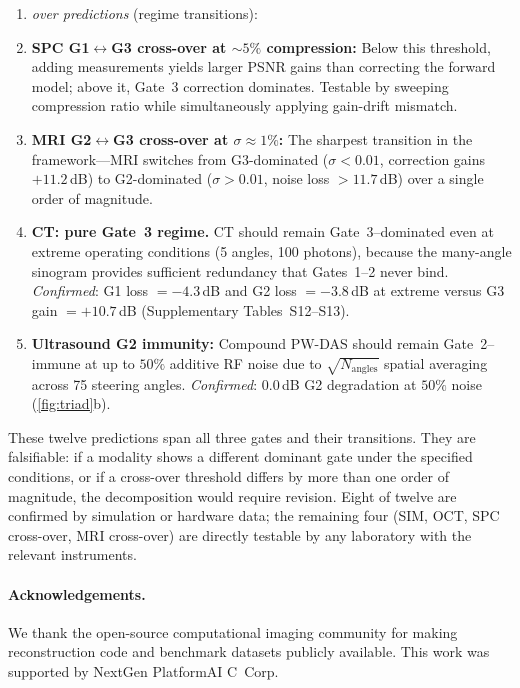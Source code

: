 \begin{enumerate}
\item[\textit{Cross-}] \textit{over predictions} (regime transitions):
\item \textbf{SPC G1$\leftrightarrow$G3 cross-over at ${\sim}5\%$ compression:} Below this threshold, adding measurements yields larger PSNR gains than correcting the forward model; above it, Gate~3 correction dominates. Testable by sweeping compression ratio while simultaneously applying gain-drift mismatch.
\item \textbf{MRI G2$\leftrightarrow$G3 cross-over at $\sigma \approx 1\%$:} The sharpest transition in the framework---MRI switches from G3-dominated ($\sigma{<}0.01$, correction gains $+11.2$\,dB) to G2-dominated ($\sigma{>}0.01$, noise loss $>11.7$\,dB) over a single order of magnitude.
\item \textbf{CT: pure Gate~3 regime.} CT should remain Gate~3--dominated even at extreme operating conditions (5 angles, 100 photons), because the many-angle sinogram provides sufficient redundancy that Gates~1--2 never bind. \emph{Confirmed}: G1 loss $= -4.3$\,dB and G2 loss $= -3.8$\,dB at extreme versus G3 gain $= +10.7$\,dB (Supplementary Tables~S12--S13).
\item \textbf{Ultrasound G2 immunity:} Compound PW-DAS should remain Gate~2--immune at up to $50\%$ additive RF noise due to $\sqrt{N_{\mathrm{angles}}}$ spatial averaging across 75 steering angles. \emph{Confirmed}: $0.0$\,dB G2 degradation at $50\%$ noise (\cref{fig:triad}b).
\end{enumerate}
\noindent These twelve predictions span all three gates and their transitions. They are falsifiable: if a modality shows a different dominant gate under the specified conditions, or if a cross-over threshold differs by more than one order of magnitude, the decomposition would require revision. Eight of twelve are confirmed by simulation or hardware data; the remaining four (SIM, OCT, SPC cross-over, MRI cross-over) are directly testable by any laboratory with the relevant instruments.



\paragraph{Acknowledgements.}
We thank the open-source computational imaging community for making reconstruction code and benchmark datasets publicly available. This work was supported by NextGen PlatformAI C~Corp.

